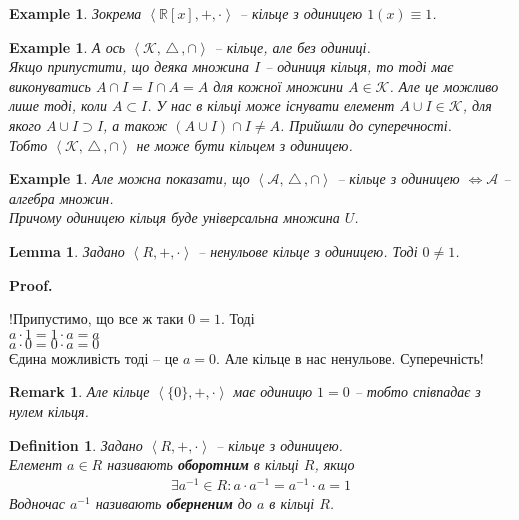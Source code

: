 \documentclass[a4paper, 10pt]{article}
\makeatletter
\theoremstyle{theoremdd}
\theoremstyle{theoremdd}
\newtheorem{definition}[theorem]{Definition}
\theoremstyle{theoremdd}
\theoremstyle{theoremdd}
\theoremstyle{theoremdd}
\newtheorem{example}[theorem]{Example}
\theoremstyle{theoremdd}
\theoremstyle{theoremdd}
\theoremstyle{theoremdd}
\theoremstyle{theoremdd}
\theoremstyle{theoremdd}
\theoremstyle{theoremdd}
\newtheorem{remark}[theorem]{Remark}
\theoremstyle{theoremdd}
\theoremstyle{theoremdd}
\newtheorem{lemma}[theorem]{Lemma}
\theoremstyle{theoremdd}
\theoremstyle{theoremdd}
\renewenvironment{proof}[1][Proof.\\]{\par
\pushQED{\hfill \qed}%
\normalfont \topsep6\p@\@plus6\p@\relax
\trivlist
\item\relax
{\bfseries
#1\@addpunct{.}}\hspace\labelsep\ignorespaces
}{%
\popQED\endtrivlist\@endpefalse
}
\newcommand{\symdif}{\,\triangle\,} %
\makeatother
\begin{document}
\begin{example}
Зокрема $\left<\mathbb{R}[x],+,\cdot \right>$ -- кільце з одиницею $1(x) \equiv 1$.
\end{example}

\begin{example}
А ось $\left<\mathcal{K}, \symdif, \cap \right>$ -- кільце, але без одиниці.\\
Якщо припустити, що деяка множина $I$ -- одиниця кільця, то тоді має виконуватись $A \cap I = I \cap A = A$ для кожної множини $A \in \mathcal{K}$. Але це можливо лише тоді, коли $A \subset I$. У нас в кільці може існувати елемент $A \cup I \in \mathcal{K}$, для якого $A \cup I \supset I$, а також $(A \cup I) \cap I \neq A$. Прийшли до суперечності.\\
Тобто $\left<\mathcal{K}, \symdif, \cap \right>$ не може бути кільцем з одиницею.
\end{example}

\begin{example}
Але можна показати, що $\left<\mathcal{A}, \symdif, \cap \right>$ -- кільце з одиницею $\iff \mathcal{A}$ -- алгебра множин. \\
Причому одиницею кільця буде універсальна множина $U$.
\end{example}

\begin{lemma}
Задано $\left<R,+,\cdot \right>$ -- ненульове кільце з одиницею. Тоді $0 \neq 1$.
\end{lemma}

\begin{proof}
!Припустимо, що все ж таки $0 = 1$. Тоді\\
$a \cdot 1 = 1 \cdot a = a$\\
$a \cdot 0 = 0 \cdot a = 0$\\
Єдина можливість тоді -- це $a = 0$. Але кільце в нас ненульове. Суперечність!
\end{proof}

\begin{remark}
Але кільце $\left< \{0\},+,\cdot \right>$ має одиницю $1 = 0$ -- тобто співпадає з нулем кільця.
\end{remark}

\begin{definition}
Задано $\left<R,+,\cdot \right>$ -- кільце з одиницею.\\
Елемент $a \in R$ називають \textbf{оборотним} в кільці $R$, якщо
\begin{align*}
\exists a^{-1} \in R: a \cdot a^{-1} = a^{-1} \cdot a = 1
\end{align*}
Водночас $a^{-1}$ називають \textbf{оберненим} до $a$ в кільці $R$.
\end{definition}
\end{document}
